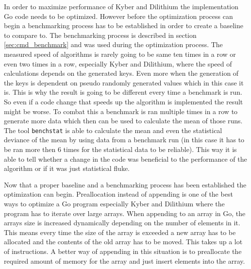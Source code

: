 In order to maximize performance of Kyber and Dilithium the implementation Go code needs to be optimized. However before the optimization process can begin a benchmarking process has to be established in order to create a baseline to compare to. The benchmarking process is described in section \ref{sec:cmd_benchmark} and was used during the optimization process. The measured speed of algorithms is rarely going to be same ten times in a row or even two times in a row, especially Kyber and Dilithium, where the speed of calculations depends on the generated keys. Even more when the generation of the keys is dependent on pseudo randomly generated values which in this case it is. This is why the result is going to be different every time a benchmark is run. So even if a code change that speeds up the algorithm is implemented the result might be worse. To combat this a benchmark is ran multiple times in a row to generate more data which then can be used to calculate the mean of those runs. The tool \texttt{benchstat} is able to calculate the mean and even the statistical deviance of the mean by using data from a benchmark run (in this case it has to be ran more then 6 times for the statistical data to be reliable). This way it is able to tell whether a change in the code was beneficial to the performance of the algorithm or if it was just statistical fluke.

Now that a proper baseline and a benchmarking process has been established the optimization can begin. Preallocation instead of appending is one of the best ways to optimize a Go program especially Kyber and Dilithium where the program has to iterate over large arrays. When appending to an array in Go, the arrays size is increased dynamically depending on the number of elements in it. This means every time the size of the array is exceeded a new array has to be allocated and the contents of the old array has to be moved. This takes up a lot of instructions. A better way of appending in this situation is to preallocate the required amount of memory for the array and just insert elements into the array.

